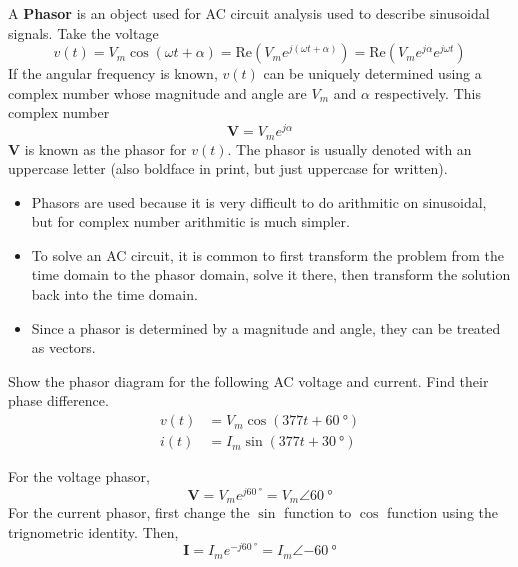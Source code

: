 \documentclass{article}
\begin{document}
\begin{definition}
    A \textbf{Phasor} is an object used for AC circuit analysis used to describe sinusoidal signals. Take the voltage 
    \begin{equation}
        v(t)=V_m\cos(\omega t+\alpha)=\text{Re}(V_me^{j(\omega t+\alpha)})=\text{Re}(V_me^{j\alpha}e^{j\omega t})
    \end{equation}
    If the angular frequency is known, $v(t)$ can be uniquely determined using a complex number whose magnitude and angle are $V_m$ and $\alpha$ respectively. This complex number 
    \begin{equation}
        \mathbf V=V_me^{j\alpha}
    \end{equation}
    $\mathbf V$ is known as the phasor for $v(t)$. The phasor is usually denoted with an uppercase letter (also boldface in print, but just uppercase for written).
\end{definition}
\begin{itemize}
    \item Phasors are used because it is very difficult to do arithmitic on sinusoidal, but for complex number arithmitic is much simpler. 
    \item To solve an AC circuit, it is common to first transform the problem from the time domain to the phasor domain, solve it there, then transform the solution back into the time domain. 
    \item Since a phasor is determined by a magnitude and angle, they can be treated as vectors. 
\end{itemize}
\begin{example}
    Show the phasor diagram for the following AC voltage and current. Find their phase difference.
    \begin{align*}
        v(t)&=V_m\cos(377t+\SI{60}{\degree})\\
        i(t)&=I_m\sin(377t+\SI{30}{\degree})
    \end{align*}
\end{example}
\begin{sol}
    For the voltage phasor, 
    \begin{equation}
        \mathbf V=V_me^{j\SI{60}{\degree}}=V_m\angle\SI{60}{\degree}
    \end{equation}
    For the current phasor, first change the $\sin$ function to $\cos$ function using the trignometric identity. Then,
    \begin{equation}
        \mathbf I=I_me^{-j\SI{60}{\degree}}=I_m\angle\SI{-60}{\degree}
    \end{equation}
    \begin{center}
    \end{center}
\end{sol}
\end{document}
